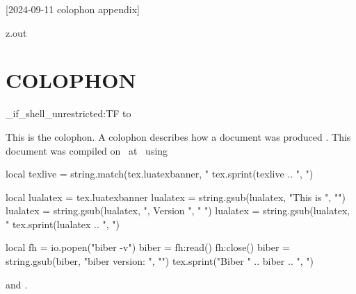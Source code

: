 [2024-09-11 colophon appendix]

\begin{VerbatimOut}{z.out}
\chapter*{COLOPHON}
\label{ap:colophon}

\ExplSyntaxOn
    {
      \sys_if_shell_unrestricted:TF
        { }
        {
          \immediate{} to \junk
        }
    }
\ExplSyntaxOff

This is the colophon.
A colophon describes how a document was produced \cite{diggypod-colophon}.
This document was compiled on \ZZDateRun\ at \ZZTimeRun\ using
\begin{luacode*}
  local texlive = string.match(tex.luatexbanner, "%
  tex.sprint(texlive .. ", ")

  local lualatex = tex.luatexbanner
  lualatex = string.gsub(lualatex, "This is ", "")
  lualatex = string.gsub(lualatex, ", Version ", " ")
  lualatex = string.gsub(lualatex, " %
  tex.sprint(lualatex .. ", ")

  local fh = io.popen("biber -v")
  biber = fh:read()
  fh:close()
  biber = string.gsub(biber, "biber version: ", "")
  tex.sprint("Biber " .. biber .. ", ")
\end{luacode*}
and \PurdueThesisVersion.


\end{VerbatimOut}
